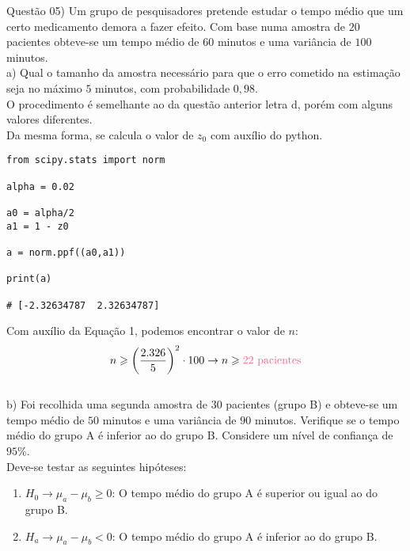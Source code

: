 
\noindent \textcolor{COLOR1}{Questão 05)} Um grupo de pesquisadores pretende estudar o tempo médio que um certo medicamento demora a fazer efeito. Com base numa amostra de $20$ pacientes obteve-se um tempo médio de $60$ minutos e uma variância de $100$ minutos.
\\

a) Qual o tamanho da amostra necessário para que o erro cometido na estimação seja no máximo $5$ minutos, com probabilidade $0,98$.
\\

O procedimento é semelhante ao da questão anterior letra d, porém com alguns valores diferentes.\\

Da mesma forma, se calcula o valor de $z_0$ com auxílio do python.\\

\begin{lstlisting}
from scipy.stats import norm
        
alpha = 0.02
                
a0 = alpha/2
a1 = 1 - z0
        
a = norm.ppf((a0,a1))
                
print(a)
        
# [-2.32634787  2.32634787]
\end{lstlisting}

Com auxílio da Equação 1, podemos encontrar o valor de $n$:
\\

\[
    n\geqslant \biggl(\frac{2.326}{5}\biggr)^2 \cdot 100 \to n\geqslant \textcolor{COLOR2}{22\ \text{pacientes}}
\]
\\

b) Foi recolhida uma segunda amostra de $30$ pacientes (grupo B) e obteve-se um tempo médio de $50$ minutos e uma variância de $90$ minutos. Verifique se o tempo médio do grupo A é inferior ao do grupo B. Considere um nível de confiança de $95\%$.
\\

Deve-se testar as seguintes hipóteses:

\begin{enumerate}
    \item $H_0\to \mu_a - \mu_b\geqslant 0$: O tempo médio do grupo A é superior ou igual ao do grupo B.
    \item $H_a\to \mu_a - \mu_b< 0$: O tempo médio do grupo A é inferior ao do grupo B.
\end{enumerate}

